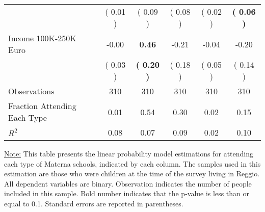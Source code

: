 \begin{table}[H]
{\begin{tabular}{lccccc}
\quad  & (     0.01 ) & (     0.09 )  & (     0.08 )  & (     0.02 ) & \textbf{(     0.06 )} \\
\quad Income 100K-250K Euro &     -0.00 & \textbf{     0.46} &     -0.21 &     -0.04 &     -0.20 \\
\quad  & (     0.03 ) & \textbf{(     0.20 )}  & (     0.18 )  & (     0.05 ) & (     0.14 ) \\
\midrule
Observations & 310 & 310 & 310 & 310 & 310 \\
Fraction Attending Each Type &      0.01 &      0.54 &      0.30 &      0.02 &      0.15 \\
\midrule
$ R^2$ &      0.08 &      0.07 &      0.09 &      0.02 &      0.10 \\
\bottomrule
\end{tabular}}
\end{table}
\begin{scriptsize}
\noindent\underline{Note:} This table presents the linear probability model estimations for attending each type of Materna schools, indicated by each column. The samples used in this estimation are those who were children at the time of the survey living in Reggio. All dependent variables are binary. Observation indicates the number of people included in this sample. Bold number indicates that the p-value is less than or equal to 0.1. Standard errors are reported in parentheses.
\end{scriptsize}
